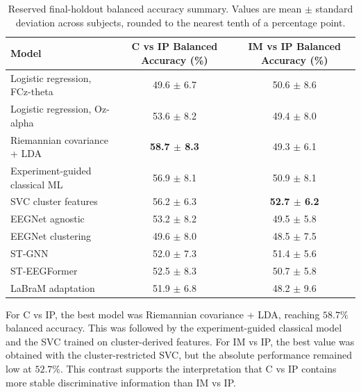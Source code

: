 \documentclass[11pt,a4paper,chapterprefix=false,parskip=false]{scrreprt}
\begin{document}
\begin{table}[H]
    \centering
    \caption{Reserved final-holdout balanced accuracy summary. Values are mean $\pm$ standard deviation across subjects, rounded to the nearest tenth of a percentage point.}
    \label{tab:balanced-accuracy}
    \small
    \begin{tabularx}{\textwidth}{@{}lcc@{}}
        \toprule
        Model                          & C vs IP Balanced Accuracy (\%) & IM vs IP Balanced Accuracy (\%) \\
        \midrule
        Logistic regression, FCz-theta & 49.6 $\pm$ 6.7                 & 50.6 $\pm$ 8.6                  \\
        Logistic regression, Oz-alpha  & 53.6 $\pm$ 8.2                 & 49.4 $\pm$ 8.0                  \\
        Riemannian covariance + LDA    & \textbf{58.7 $\pm$ 8.3}        & 49.3 $\pm$ 6.1                  \\
        Experiment-guided classical ML & 56.9 $\pm$ 8.1                 & 50.9 $\pm$ 8.1                  \\
        SVC cluster features           & 56.2 $\pm$ 6.3                 & \textbf{52.7 $\pm$ 6.2}         \\
        EEGNet agnostic                & 53.2 $\pm$ 8.2                 & 49.5 $\pm$ 5.8                  \\
        EEGNet clustering              & 49.6 $\pm$ 8.0                 & 48.5 $\pm$ 7.5                  \\
        ST-GNN                         & 52.0 $\pm$ 7.3                 & 51.4 $\pm$ 5.6                  \\
        ST-EEGFormer                   & 52.5 $\pm$ 8.3                 & 50.7 $\pm$ 5.8                  \\
        LaBraM adaptation              & 51.9 $\pm$ 6.8                 & 48.2 $\pm$ 9.6                  \\
        \bottomrule
    \end{tabularx}
\end{table}

For C vs IP, the best model was Riemannian covariance + LDA, reaching $58.7\%$ balanced accuracy. This was followed by the experiment-guided classical model and the SVC trained on cluster-derived features. For IM vs IP, the best value was obtained with the cluster-restricted SVC, but the absolute performance remained low at $52.7\%$. This contrast supports the interpretation that C vs IP contains more stable discriminative information than IM vs IP.
\end{document}

